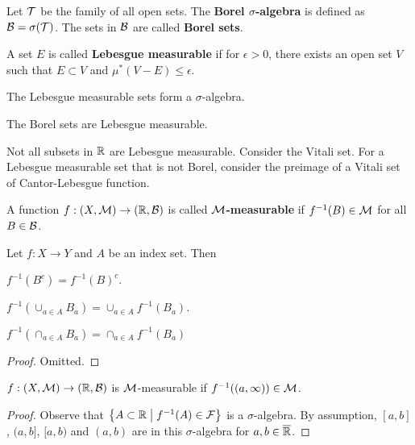 \begin{definition}
    Let $\mathcal{T}$ be the family of all open sets. The \textbf{Borel $\sigma$-algebra} 
    is defined as $\mathcal{B} = \sigma(\mathcal{T})$. The sets in $\mathcal{B}$ are called 
    \textbf{Borel sets}.
\end{definition}

\begin{definition}
    A set $E$ is called \textbf{Lebesgue measurable} if for $\epsilon>0$, 
    there exists an open set $V$ such that $E\subset V$ and 
    $\mu^*(V-E)\leq\epsilon$. 
\end{definition}
\begin{remark}
    The Lebesgue measurable sets form a $\sigma$-algebra.
\end{remark}
\begin{remark}
    The Borel sets are Lebesgue measurable.
\end{remark}
\begin{remark}
    Not all subsets in $\mathbb{R}$ are Lebesgue measurable. Consider the 
    Vitali set. For a Lebesgue measurable set that is not Borel, 
    consider the preimage of a Vitali set of Cantor-Lebesgue function.
\end{remark}

\begin{definition}
    A function $f:(X,\mathcal{M})\to(\mathbb{R},\mathcal{B})$ is called \textbf{$\mathcal{M}$-measurable} if 
    $f^{-1}(B)\in\mathcal{M}$ for all $B\in\mathcal{B}$.
\end{definition}

\begin{proposition}
    Let $f:X\to Y$ and $A$ be an index set. Then 
    \begin{thmenum}
        \item $f^{-1}(B^c) = f^{-1}(B)^c$. 
        \item $f^{-1}(\cup_{a\in A} B_a) = \cup_{a\in A} f^{-1}(B_a)$. 
        \item $f^{-1}(\cap_{a\in A} B_a) = \cap_{a\in A} f^{-1}(B_a)$
    \end{thmenum}
\end{proposition}
\begin{proof}
    Omitted.
\end{proof}

\begin{proposition}
    $f:(X,\mathcal{M})\to(\mathbb{R},\mathcal{B})$ is $\mathcal{M}$-measurable if $f^{-1}((a,\infty))\in\mathcal{M}$.
\end{proposition}
\begin{proof}
    Observe that $\left\{ A\subset\mathbb{R} \;\middle\vert\; f^{-1}(A)\in\mathcal{F} \right\}$ is a $\sigma$-algebra. 
    By assumption, $[a,b]$, $(a,b]$, $[a,b)$ and $(a,b)$ are in this 
    $\sigma$-algebra for $a,b\in\overline{\mathbb{R}}$.
\end{proof}

